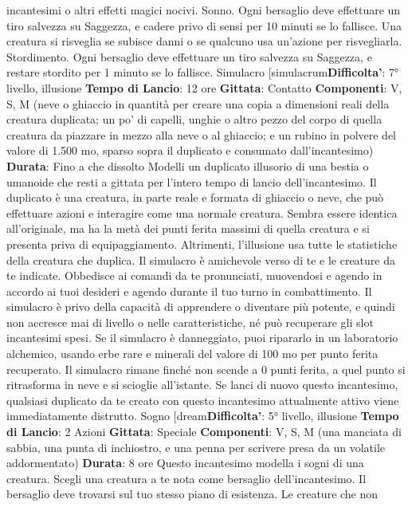 \begin{multicols}{2}
incantesimi o altri effetti magici nocivi.
Sonno. Ogni bersaglio deve effettuare un tiro salvezza
su Saggezza, e cadere privo di sensi per 10 minuti se lo
fallisce. Una creatura si risveglia se subisce danni o se
qualcuno usa un’azione per risvegliarla.
Stordimento. Ogni bersaglio deve effettuare un tiro
salvezza su Saggezza, e restare stordito per 1 minuto
se lo fallisce.
Simulacro
[simulacrum\textbf{Difficolta'}:
7° livello, illusione
\textbf{Tempo di Lancio}: 12 ore
\textbf{Gittata}: Contatto
\textbf{Componenti}: V, S, M (neve o ghiaccio in quantità per
creare una copia a dimensioni reali della creatura
duplicata; un po’ di capelli, unghie o altro pezzo del
corpo di quella creatura da piazzare in mezzo alla neve
o al ghiaccio; e un rubino in polvere del valore di 1.500
mo, sparso sopra il duplicato e consumato
dall’incantesimo)
\textbf{Durata}: Fino a che dissolto
Modelli un duplicato illusorio di una bestia o umanoide
che resti a gittata per l’intero tempo di lancio
dell’incantesimo. Il duplicato è una creatura, in parte
reale e formata di ghiaccio o neve, che può effettuare
azioni e interagire come una normale creatura. Sembra
essere identica all’originale, ma ha la metà dei punti
ferita massimi di quella creatura e si presenta priva di
equipaggiamento. Altrimenti, l’illusione usa tutte le
statistiche della creatura che duplica.
Il simulacro è amichevole verso di te e le creature da te
indicate. Obbedisce ai comandi da te pronunciati,
muovendosi e agendo in accordo ai tuoi desideri e
agendo durante il tuo turno in combattimento. Il
simulacro è privo della capacità di apprendere o
diventare più potente, e quindi non accresce mai di
livello o nelle caratteristiche, né può recuperare gli slot
incantesimi spesi.
Se il simulacro è danneggiato, puoi ripararlo in un
laboratorio alchemico, usando erbe rare e minerali del
valore di 100 mo per punto ferita recuperato. Il
simulacro rimane finché non scende a 0 punti ferita, a
quel punto si ritrasforma in neve e si scioglie all’istante.
Se lanci di nuovo questo incantesimo, qualsiasi
duplicato da te creato con questo incantesimo
attualmente attivo viene immediatamente distrutto.
Sogno
[dream\textbf{Difficolta'}:
5° livello, illusione
\textbf{Tempo di Lancio}: 2 Azioni
\textbf{Gittata}: Speciale
\textbf{Componenti}: V, S, M (una manciata di sabbia, una
punta di inchiostro, e una penna per scrivere presa da
un volatile addormentato)
\textbf{Durata}: 8 ore
Questo incantesimo modella i sogni di una creatura.
Scegli una creatura a te nota come bersaglio
dell’incantesimo. Il bersaglio deve trovarsi sul tuo
stesso piano di esistenza. Le creature che non

\end{multicols}
